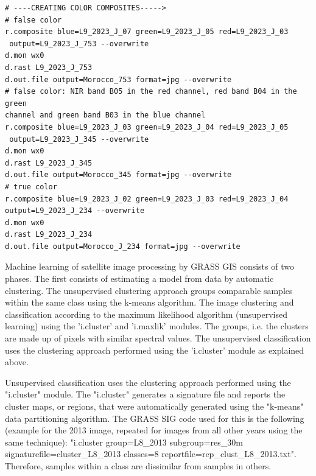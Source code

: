 \documentclass[geomatics,article,submit,pdftex,moreauthors]{Definitions/mdpi}
\begin{document}
\begin{footnotesize}
\begin{verbatim}
# ----CREATING COLOR COMPOSITES----->
# false color
r.composite blue=L9_2023_J_07 green=L9_2023_J_05 red=L9_2023_J_03
 output=L9_2023_J_753 --overwrite
d.mon wx0
d.rast L9_2023_J_753
d.out.file output=Morocco_753 format=jpg --overwrite
# false color: NIR band B05 in the red channel, red band B04 in the green 
channel and green band B03 in the blue channel
r.composite blue=L9_2023_J_03 green=L9_2023_J_04 red=L9_2023_J_05
 output=L9_2023_J_345 --overwrite
d.mon wx0
d.rast L9_2023_J_345
d.out.file output=Morocco_345 format=jpg --overwrite
# true color
r.composite blue=L9_2023_J_02 green=L9_2023_J_03 red=L9_2023_J_04
output=L9_2023_J_234 --overwrite
d.mon wx0
d.rast L9_2023_J_234
d.out.file output=Morocco_J_234 format=jpg --overwrite
\end{verbatim}
\end{footnotesize}

Machine learning of satellite image processing by GRASS GIS consists of two phases. The first consists of estimating a model from data by automatic clustering. The unsupervised clustering approach groups comparable samples within the same class using the k-means algorithm. The image clustering and classification according to the maximum likelihood algorithm (unsupervised learning) using the 'i.cluster' and 'i.maxlik' modules. The groups, i.e. the clusters are made up of pixels with similar spectral values. The unsupervised classification uses the clustering approach performed using the 'i.cluster' module as explained above.

Unsupervised classification uses the clustering approach performed using the "i.cluster" module. The "i.cluster" generates a signature file and reports the cluster maps, or regions, that were automatically generated using the "k-means" data partitioning algorithm. The GRASS SIG code used for this is the following (example for the 2013 image, repeated for images from all other years using the same technique): "i.cluster group=L8\_2013 subgroup=res\_30m signaturefile=cluster\_L8\_2013 classes=8 reportfile=rep\_clust\_L8\_2013.txt". Therefore, samples within a class are dissimilar from samples in others.
\end{document}
